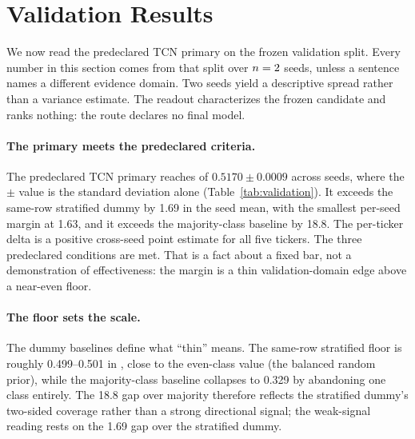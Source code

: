 \section{Validation Results}

We now read the predeclared TCN primary on the frozen validation split. Every
number in this section comes from that split over $n=2{}$ seeds, unless a
sentence names a different evidence domain. Two seeds yield a descriptive spread
rather than a variance estimate. The readout characterizes the frozen candidate
and ranks nothing: the route declares no final model.

\paragraph{The primary meets the predeclared criteria.}
The predeclared TCN primary reaches \macrofone{} of $0.5170 \pm 0.0009$ across
\numseeds{} seeds, where the $\pm$ value is the standard deviation alone
(Table~\ref{tab:validation}). It exceeds the same-row stratified dummy by
1.69\pp{} in the seed mean, with the smallest per-seed margin at 1.63\pp{}, and it
exceeds the majority-class baseline by 18.8\pp{}. The per-ticker delta is a
positive cross-seed point estimate for all five tickers. The three predeclared
conditions are met. That is a fact about a fixed bar, not a demonstration of
effectiveness: the margin is a thin validation-domain edge above a near-even
floor.

\paragraph{The floor sets the scale.}
The dummy baselines define what ``thin'' means. The same-row stratified floor is
roughly 0.499--0.501 in \macrofone{}, close to the even-class value (the
balanced random prior), while the
majority-class baseline collapses to 0.329 by abandoning one class entirely. The
18.8\pp{} gap over majority therefore reflects the stratified dummy's two-sided
coverage rather than a strong directional signal; the weak-signal reading rests
on the 1.69\pp{} gap over the stratified dummy.

